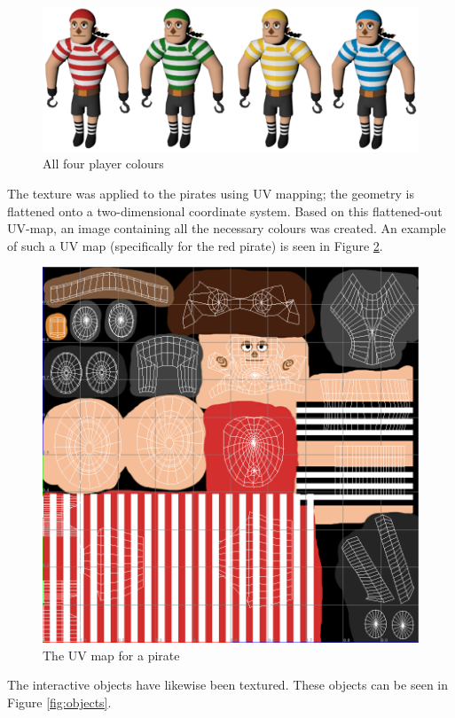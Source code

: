 \begin{figure}[h!]
	\centering
	\includegraphics[width=\textwidth]{figures/pirate_rainbow.png}
	\caption{All four player colours \label{fig:pirate_rainbow}}
\end{figure}

The texture was applied to the pirates using UV mapping; the geometry is flattened onto a two-dimensional coordinate system. Based on this flattened-out UV-map, an image containing all the necessary colours was created. An example of such a UV map (specifically for the red pirate) is seen in Figure \ref{fig:uv_map}.

\begin{figure}[h!]
	\centering
	\includegraphics[width=0.7 \textwidth]{figures/uv_map.png}
	\caption{The UV map for a pirate \label{fig:uv_map}}
\end{figure}

The interactive objects have likewise been textured. These objects can be seen in Figure \ref{fig:objects}.

